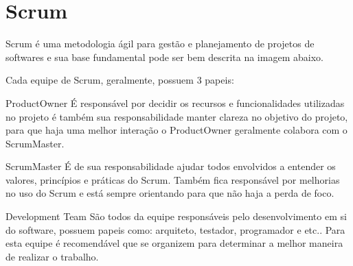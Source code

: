 \lipsum[11]


\section{Scrum}
\label{sec:scrum}

Scrum é uma metodologia ágil para gestão e planejamento de projetos de softwares e sua base fundamental pode ser bem descrita na imagem abaixo.

	\begin{figure}[h!]
		\centering
	\end{figure}

Cada equipe de Scrum, geralmente, possuem 3 papeis:
\begin{alineascomponto}
	\item ProductOwner
É responsável por decidir os recursos e funcionalidades utilizadas no projeto é também sua responsabilidade manter clareza no objetivo do projeto, para que haja uma melhor interação o ProductOwner geralmente colabora com o ScrumMaster.

	\item ScrumMaster
É de sua responsabilidade ajudar todos envolvidos a entender os valores, princípios e práticas do Scrum. Também fica responsável por melhorias no uso do Scrum e está sempre orientando para que não haja a perda de foco. 

	\item Development Team
São todos da equipe responsáveis pelo desenvolvimento em si do software, possuem papeis como: arquiteto, testador, programador e etc.. Para esta equipe é recomendável que se organizem para determinar a melhor maneira de realizar o trabalho.

	\end{alineascomponto}
	
